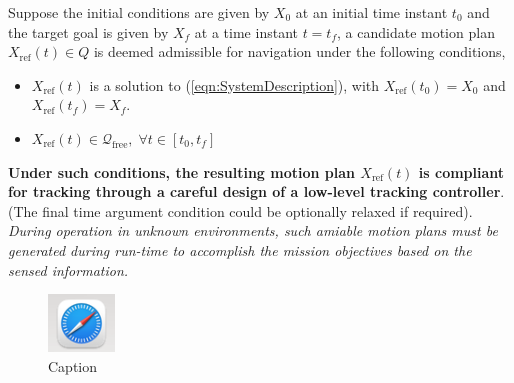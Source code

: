 \documentclass{article}
\begin{document}
Suppose the initial conditions are given by $X_0$ at an initial time instant $t_0$ and the target goal is given by $X_f$ at a time instant $t=t_f$, a candidate motion plan $X_{\text{ref}}(t) \in Q$ is deemed admissible for navigation under the following conditions,
\begin{itemize}
    \item $X_{\text{ref}}(t)$ is a solution to (\ref{eqn:SystemDescription}), with $X_{\text{ref}}(t_0) = X_0$ and $X_{\text{ref}}(t_f) = X_f$.
    \item $X_{\text{ref}}(t) \in \mathcal{Q}_{\text{free}},\; \forall t\in[t_0,t_f]$  
\end{itemize}
\textbf{Under such conditions, the resulting motion plan $X_{\text{ref}}(t)$ is compliant for tracking through a careful design of a low-level tracking controller}. (The final time argument condition could be optionally relaxed if required). \textit{During operation in unknown environments, such amiable motion plans must be generated during run-time to accomplish the mission objectives based on the sensed information.}
\begin{figure}
    \centering
    \includegraphics[scale=0.5]{media/turtlebot3_burger_components.png}
    \caption{Caption}
    \label{fig:enter-label}
\end{figure}
\end{document}
